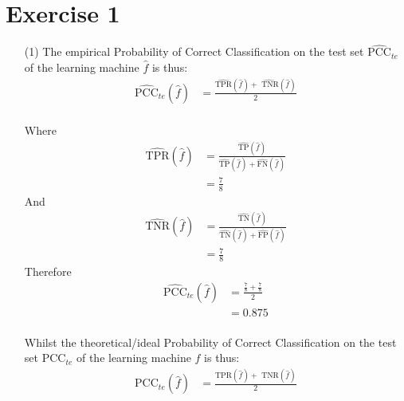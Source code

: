 \documentclass[12pt,a4paper]{article}
\begin{document}
\section*{Exercise 1}
\begin{enumerate}
	\item[(1)] 
			The empirical  Probability of Correct Classification  on the test set $\widehat{\text{PCC}}_{te}$ of the learning machine $\widehat{f} $  is thus: 
			\begin{align*}
					\widehat{\text{PCC}}_{te}(\widehat{f})  &=  \frac{\widehat{\text{TPR}}(\widehat{f}) + \widehat{\text{ TNR}}(\widehat{f}) }{2}\\
			\end{align*}
			
			Where 
			\begin{align*}
						\widehat{\text{TPR}}(\widehat{f}) &=  \frac{\widehat{ \text{TP} }(\widehat{f}) }{  \widehat{ \text{TP} }(\widehat{f})  + \widehat{ \text{FN} }(\widehat{f})  }\\
								&= \frac{7}{8}
			\end{align*}
And 
			\begin{align*}
						\widehat{\text{TNR}}(\widehat{f})  &=  \frac{\widehat{ \text{TN} }(\widehat{f}) }{  \widehat{ \text{TN} }(\widehat{f})  + \widehat{ \text{FP} }(\widehat{f})  }\\
								&= \frac{7}{8}
			\end{align*}
Therefore
			\begin{align*}
					\widehat{\text{PCC}}_{te}(\widehat{f})  &= \frac{\frac{7}{8} + \frac{7}{8} }{2}\\
					&= 0.875\\
			\end{align*}
	
Whilst the theoretical/ideal  Probability of Correct Classification  on the test set $\text{PCC}_{te}$ of the learning machine $\widehat{f} $  is thus: 
			\begin{align*}
					\text{PCC}_{te}(\widehat{f})  &=  \frac{\text{TPR}(\widehat{f}) + \text{ TNR}(\widehat{f}) }{2}\\
			\end{align*}
			

\end{enumerate}
\end{document}
